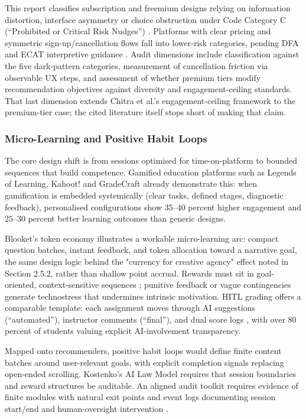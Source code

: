 \documentclass[11pt]{article}
\begin{document}
This report classifies subscription and freemium designs relying on information distortion, interface asymmetry or choice obstruction under Code Category C (``Prohibited or Critical Risk Nudges'') \parencites[33]{6087241}[4]{6295677}. Platforms with clear pricing and symmetric sign-up/cancellation flows fall into lower-risk categories, pending DFA and ECAT interpretive guidance \parencites[3]{5142478}. Audit dimensions include classification against the five dark-pattern categories, measurement of cancellation friction via observable UX steps, and assessment of whether premium tiers modify recommendation objectives against diversity and engagement-ceiling standards. That last dimension extends Chitra et al.'s engagement-ceiling framework \parencites[2252]{6502223} to the premium-tier case; the cited literature itself stops short of making that claim.

\subsubsection{Micro-Learning and Positive Habit Loops}
\label{sec:micro_learning_positive_habits} The core design shift is from sessions optimised for time-on-platform to bounded sequences that build competence. Gamified education platforms such as Legends of Learning, Kahoot! and GradeCraft already demonstrate this: when gamification is embedded systemically (clear tasks, defined stages, diagnostic feedback), personalised configurations show \parencites[9]{5645864} $35$--$40$ percent higher engagement and $25$--$30$ percent better learning outcomes than generic designs.

Blooket's token economy illustrates a workable micro-learning arc: compact question batches, instant feedback, and token allocation toward a narrative goal, the same design logic behind the "currency for creative agency" effect noted in Section 2.5.2, rather than shallow point accrual. Rewards must sit in goal-oriented, context-sensitive sequences \parencites[7]{5645864}; punitive feedback or vague contingencies generate technostress that undermines intrinsic motivation. HITL grading offers a comparable template: each assignment moves through AI suggestions (``automated''), instructor comments (``final''), and dual score logs \parencites[5]{6805789}[9]{6805789}[21]{6805789}, with over $80$ percent of students valuing explicit AI-involvement transparency.

Mapped onto recommenders, positive habit loops would define finite content batches around user-relevant goals, with explicit completion signals replacing open-ended scrolling. Kostenko's AI Law Model requires \parencites[25]{2977039} that session boundaries and reward structures be auditable. An aligned audit toolkit requires evidence of finite modules with natural exit points and event logs documenting session start/end and human-oversight intervention \parencites[21]{6805789}[25]{2977039}.
\end{document}
